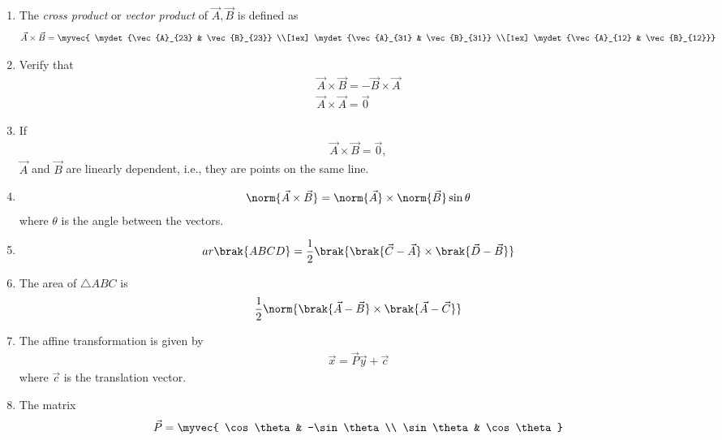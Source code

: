 \begin{enumerate}[label=\thesubsection.\arabic*.,ref=\thesubsection.\theenumi]
\item The {\em cross product} or {\em vector product} of $\vec{A}, \vec{B}$ is defined as
\begin{align}
  \label{eq:cross3d}
	\vec{A} \times \vec{B} 
	 = \myvec{ \mydet{\vec{A}_{23} & \vec{B}_{23}} \\[1ex] \mydet{\vec{A}_{31} & \vec{B}_{31}} \\[1ex] \mydet{\vec{A}_{12}  & \vec{B}_{12}}}
\end{align}
\item Verify that
\begin{align}
  \label{eq:cross3d-commute}
  \vec{A} \times \vec{B} = -  \vec{B} \times \vec{A} 
  \\
  \label{eq:cross3d-same}
  \vec{A} \times \vec{A} = \vec{0}
\end{align}
\item If 
		\label{prop:lin-dep-cross}
\begin{align}
  \vec{A} \times \vec{B} = \vec{0},
\end{align}
  $\vec{A}$ and $ \vec{B} $ are linearly dependent, i.e., they are points on the same line.
  \item 
\begin{align}
	\label{eq:cross-sin}
	\norm{ \vec{A} \times \vec{B} }
	=
	\norm{\vec{A}} \times 	\norm{\vec{B}} \sin \theta
\end{align}
where $\theta$ is the angle between the vectors.
\item 
\begin{align}
	ar\brak{ABCD} = 
         \frac{1}{2}\brak{\brak{\vec{C}-\vec{A}}\times\brak{\vec{D}-\vec{B}}} \\
        \label{eq:11/10/1/1area-diag} 
\end{align}
\item The area of $\triangle ABC$ is 
		\begin{align}
			\label{eq:tri-area-cross}
			\frac{1}{2}\norm{{\brak{\vec{A}-\vec{B}}\times \brak{\vec{A}-\vec{C}}}}
		\end{align}
	\item 
The affine transformation is given by 
\begin{align}
	\label{eq:conic_affine}
	\vec{x} = \vec{P}\vec{y}+\vec{c}
\end{align}
where $\vec{c}$ is the translation vector.
\item The matrix
\begin{align}
\vec{P} =
\myvec{
\cos\theta & -\sin\theta \\
\sin\theta & \cos\theta 
}
\end{align}
\end{enumerate}
